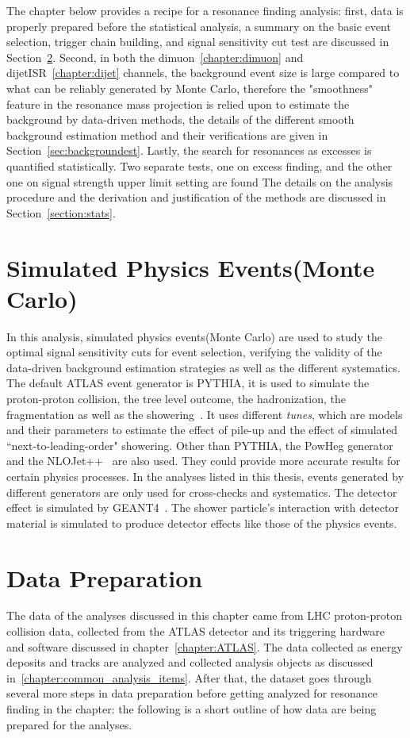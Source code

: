 The chapter below provides a recipe for a resonance finding analysis: first, data is properly prepared before the statistical analysis, a summary on the basic event selection, trigger chain building, and signal sensitivity cut test are discussed in Section~\ref{sec:dataprep}. Second, in both the dimuon~\ref{chapter:dimuon} and dijetISR~\ref{chapter:dijet} channels, the background event size is large compared to what can be reliably generated by Monte Carlo, therefore the "smoothness"
feature in the resonance mass projection is relied upon to estimate the background by data-driven methods, the details of the different smooth background estimation method and their verifications are given in Section~\ref{sec:backgroundest}. Lastly, the search for resonances as excesses is quantified statistically. Two separate tests, one on excess finding, and the other one on signal strength upper limit setting are found The details on the analysis procedure and the derivation
and justification of the methods are discussed in Section~\ref{section:stats}. 

\section{Simulated Physics Events(Monte Carlo)}
In this analysis, simulated physics events(Monte Carlo) are used to study the optimal signal sensitivity cuts for event selection, verifying the validity of the data-driven background estimation strategies as well as the different systematics.
The default ATLAS event generator is PYTHIA, it is used to simulate the proton-proton collision, the tree level outcome, the hadronization, the fragmentation as well as the showering~\cite{PYTHIA}. It uses different \textit{tunes}, which are models and their parameters to estimate the effect of pile-up and the effect of simulated ``next-to-leading-order" showering. Other than PYTHIA, the PowHeg generator~\cite{oleari2010powheg} and the NLOJet++~\cite{nagynlojet++} are also used. They could
provide more accurate results for certain physics processes. In the analyses listed in this thesis, events generated by different generators are only used for cross-checks and systematics. 
The detector effect is simulated by GEANT4~\cite{Agostinelli:602040}. The shower particle's interaction with detector material is simulated to produce detector effects like those of the physics events.



\section{Data Preparation}
\label{sec:dataprep}
The data of the analyses discussed in this chapter came from LHC proton-proton collision data, collected from the ATLAS detector and its triggering hardware and software discussed in chapter~\ref{chapter:ATLAS}. The data collected as energy deposits and tracks are analyzed and collected analysis objects as discussed in~\ref{chapter:common_analysis_items}. After that, the dataset goes through several more steps in data preparation before getting analyzed for resonance finding in the chapter: the following is a short outline of how data are being prepared for the analyses.


